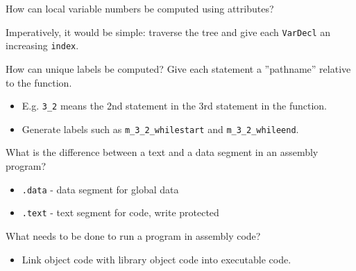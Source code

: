 \documentclass[11pt]{beamer}
\begin{document}
\begin{frame}
\begin{block}{How can local variable numbers be computed using attributes?}

Imperatively, it would be simple: traverse the tree and give each \texttt{VarDecl} an increasing \texttt{index}.
\end{block}


\begin{block}{How can unique labels be computed?}
Give each statement a ”pathname” relative to the function.

\begin{itemize}

\item E.g. \texttt{3\_2} means the 2nd statement in the 3rd statement in the function. 
\item Generate labels such as \texttt{m\_3\_2\_whilestart} and \texttt{m\_3\_2\_whileend}.

\end{itemize}

\end{block}

\end{frame}

\begin{frame}
\begin{block}{What is the difference between a text and a data segment in an assembly program?}
\begin{itemize}
\item \texttt{.data} - data segment for global data
\item \texttt{.text} - text segment for code, write protected
\end{itemize}
\end{block}

\begin{block}{What needs to be done to run a program in assembly code?}
\begin{itemize}
\item Link object code with library object code into executable code.
\end{itemize}
\end{block}

\end{frame}
\end{document}
